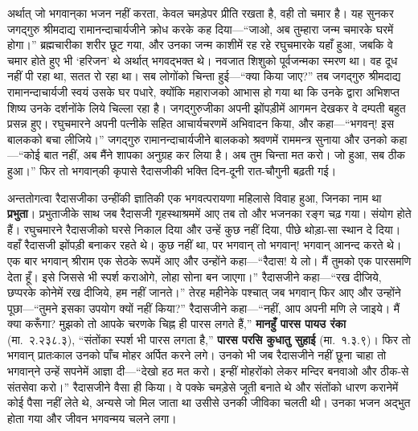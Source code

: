 \begin{sloppypar}\justifying{}
अर्थात् जो भगवान्‌का भजन नहीं करता, केवल चमड़ेपर प्रीति रखता है, वही तो चमार है। यह सुनकर जगद्गुरु श्रीमदाद्य रामानन्दाचार्यजीने क्रोध करके कह दिया—“जाओ, अब तुम्हारा जन्म चमारके घरमें होगा।” ब्रह्मचारीका शरीर छूट गया, और उनका जन्म काशीमें रह रहे रघुचमारके यहाँ हुआ, जबकि वे चमार होते हुए भी ‘हरिजन’ थे अर्थात् भगवद्भक्त थे। नवजात शिशुको पूर्वजन्मका स्मरण था। वह दूध नहीं पी रहा था, सतत रो रहा था। सब लोगोंको चिन्ता हुई—“क्या किया जाए?” तब जगद्गुरु श्रीमदाद्य रामानन्दाचार्यजी स्वयं उसके घर पधारे, क्योंकि महाराजको आभास हो गया था कि उनके द्वारा अभिशप्त शिष्य उनके दर्शनोंके लिये चिल्ला रहा है। जगद्गुरुजीका अपनी झोंपड़ीमें आगमन देखकर वे दम्पती बहुत प्रसन्न हुए। रघुचमारने अपनी पत्नीके सहित आचार्यचरणमें अभिवादन किया, और कहा—“भगवन्! इस बालकको बचा लीजिये।” जगद्गुरु रामानन्दाचार्यजीने बालकको श्रवणमें राम\-मन्त्र सुनाया और उनको कहा—“कोई बात नहीं, अब मैंने शापका अनुग्रह कर लिया है। अब तुम चिन्ता मत करो। जो हुआ, सब ठीक हुआ।” फिर तो भगवान्‌की कृपासे रैदासजीकी भक्ति दिन-दूनी रात-चौगुनी बढ़ती गई।
\end{sloppypar}
\begin{sloppypar}\justifying{}
अन्ततोगत्वा रैदासजीका उन्हींकी ज्ञातिकी एक भगवत्परायणा महिलासे विवाह हुआ, जिनका नाम था \textbf{प्रभुता}। प्रभुताजीके साथ जब रैदासजी गृहस्थाश्रममें आए तब तो और भजनका रङ्ग चढ़ गया। संयोग होते हैं। रघुचमारने रैदासजीको घरसे निकाल दिया और उन्हें कुछ नहीं दिया, पीछे थोड़ा-सा स्थान दे दिया। वहाँ रैदासजी झोंपड़ी बनाकर रहते थे। कुछ नहीं था, पर भगवान् तो भगवान्! भगवान् आनन्द करते थे। एक बार भगवान् श्रीराम एक सेठके रूपमें आए और उन्होंने कहा—“रैदास! ये लो। मैं तुमको एक पारस\-मणि देता हूँ। इसे जिससे भी स्पर्श कराओगे, लोहा सोना बन जाएगा।” रैदासजीने कहा—“रख दीजिये, छप्परके कोनेमें रख दीजिये, हम नहीं जानते।” तेरह महीनेके पश्चात् जब भगवान् फिर आए और उन्होंने पूछा—“तुमने इसका उपयोग क्यों नहीं किया?” रैदासजीने कहा—“नहीं, आप अपनी मणि ले जाइये। मैं क्या करूँगा? मुझको तो आपके चरणके चिह्न ही पारस लगते हैं,” \textbf{मानहुँ पारस पायउ रंका} (मा.~२.२३८.३), “संतोंका स्पर्श भी पारस लगता है,” \textbf{पारस परसि कुधातु सुहाई} (मा.~१.३.९)। फिर तो भगवान् प्रातःकाल उनको पाँच मोहर अर्पित करने लगे। उनको भी जब रैदासजीने नहीं छूना चाहा तो भगवान्‌ने उन्हें सपनेमें आज्ञा दी—“देखो हठ मत करो। इन्हीं मोहरोंको लेकर मन्दिर बनवाओ और ठीक-से संत\-सेवा करो।” रैदासजीने वैसा ही किया। वे पक्के चमड़ेसे जूती बनाते थे और संतोंको धारण करानेमें कोई पैसा नहीं लेते थे, अन्यसे जो मिल जाता था उसीसे उनकी जीविका चलती थी। उनका भजन अद्भुत होता गया और जीवन भगवन्मय चलने लगा।
\end{sloppypar}
